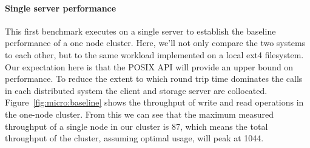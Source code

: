 \documentclass[twocolumn,10pt,letterpaper]{article}
\newcommand{\myparagraph}[1]{\vspace{-.25\baselineskip}\paragraph{#1}}
\begin{document}
\myparagraph{Single server performance}  This first benchmark executes on a
single server to establish the baseline performance of a one node cluster.
Here, we'll not only compare the two systems to each other, but to the same
workload implemented on a local ext4 filesystem.  Our expectation here is that
the POSIX API will provide an upper bound on performance.  To reduce the extent
to which round trip time dominates the calls in each distributed system the
client and storage server are collocated.  Figure~\ref{fig:micro:baseline} shows
the throughput of write and read operations in the one-node cluster.  From this
we can see that the maximum measured throughput of a single node in our cluster
is \unit{87}{\mega\byte\per\second}, which means the total throughput of the
cluster, assuming optimal usage, will peak at
\unit{1044}{\mega\byte\per\second}.
\end{document}
